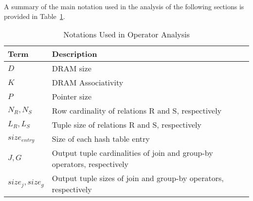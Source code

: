 A summary of the main notation used in the analysis of the following
sections is provided in Table~\ref{tab:notations}.

\begin{table}[!h]
\centering
\caption{Notations Used in Operator Analysis}
\label{tab:notations}
\begin{small}
\begin{tabular}{p{2cm}p{9cm}}
\toprule  
\textbf{Term} & \textbf{Description}\\ 
\midrule
\textbf{$D$} & DRAM size\\
\textbf{$K$} & DRAM Associativity\\
\textbf{$P$} & Pointer size\\
\textbf{$N_R, N_S$} & Row cardinality of relations R and S, respectively\\
\textbf{$L_R, L_S$} & Tuple size of relations R and S, respectively\\
\textbf{$size_{entry}$} & Size of each hash table entry\\
\textbf{$J,G$} & Output tuple cardinalities of join and group-by operators, respectively\\
\textbf{$size_{j},size_{g}$} & Output tuple sizes of join and group-by operators, respectively\\
\bottomrule
\end{tabular}
\end{small}
\end{table}
